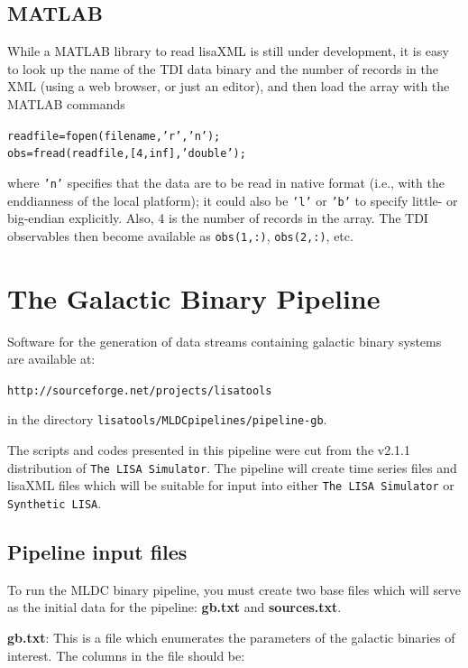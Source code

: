 \documentclass[11pt]{report}
\begin{document}
\subsection{MATLAB}

While a MATLAB library to read lisaXML is still under development, it is easy to look up the name of the TDI data binary and the number of records in the XML (using a web browser, or just an editor), and then load the array with the MATLAB commands
%
\begin{alltt}
readfile = fopen(filename,'r','n');
obs = fread(readfile,[4,inf],'double');

\end{alltt}
%
where \texttt{'n'} specifies that the data are to be read in native format (i.e., with the enddianness of the local platform); it could also be \texttt{'l'} or \texttt{'b'} to specify little- or big-endian explicitly. Also, 4 is the number of records in the array. The TDI observables then become available as \texttt{obs(1,:)}, \texttt{obs(2,:)}, etc.

\section{The Galactic Binary Pipeline}

Software for the generation of data streams containing galactic binary systems are available at:

{\tt http://sourceforge.net/projects/lisatools}

\noindent
in the directory {\tt lisatools/MLDCpipelines/pipeline-gb}.

The scripts and codes presented in this pipeline were cut from the
v2.1.1 distribution of \texttt{The LISA Simulator}.  The pipeline will
create time series files and lisaXML files which will be suitable for
input into either \texttt{The LISA Simulator} or \texttt{Synthetic
LISA}.

\subsection{Pipeline input files}
To run the MLDC binary pipeline, you must create two base files which
will serve as the initial data for the pipeline: {\bf gb.txt} and {\bf
sources.txt}.

{\bf gb.txt}: This is a file which enumerates the parameters of the galactic
binaries of interest.  The columns in the file should be:
\end{document}
